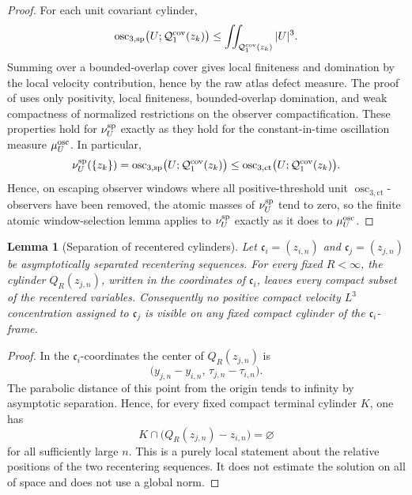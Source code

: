 \documentclass[11pt]{amsart}
\numberwithin{equation}{section}
\theoremstyle{plain}
\newtheorem{lemma}[lemma]{Lemma}
\theoremstyle{definition}
\theoremstyle{remark}
\newcommand{\oscsp}{\operatorname{osc}_{3,\mathrm{sp}}}
\newcommand{\actthree}{\operatorname{osc}_{3,\mathrm{ct}}}
\begin{document}
\begin{proof}
For each unit covariant cylinder,
\[
   \oscsp\bigl(U;\mathcal Q_1^{\rm cov}(z_k)\bigr)
   \le
   \iint_{\mathcal Q_1^{\rm cov}(z_k)}|U|^3 .
\]
Summing over a bounded-overlap cover gives local finiteness and domination by
the local velocity contribution, hence by the raw atlas defect measure.  The proof of
 uses only positivity, local finiteness,
bounded-overlap domination, and weak compactness of normalized restrictions on
the observer compactification.  These properties hold for
\(\nu_U^{\rm sp}\) exactly as they hold for the constant-in-time oscillation
measure \(\mu_U^{\rm osc}\).  In particular,
\[
   \nu_U^{\rm sp}(\{z_k\})
   =
   \oscsp\bigl(U;\mathcal Q_1^{\rm cov}(z_k)\bigr)
   \le
   \actthree\bigl(U;\mathcal Q_1^{\rm cov}(z_k)\bigr).
\]
Hence, on escaping observer windows where all positive-threshold unit
\(\actthree\)-observers have been removed, the atomic masses of
\(\nu_U^{\rm sp}\) tend to zero, so the finite atomic window-selection lemma
applies to \(\nu_U^{\rm sp}\) exactly as it does to \(\mu_U^{\rm osc}\).
\end{proof}

\begin{lemma}[Separation of recentered cylinders]
\label{lem:separated-recentered-cylinders}
Let \(\mathfrak c_i=(z_{i,n})\) and \(\mathfrak c_j=(z_{j,n})\) be
asymptotically separated recentering sequences.  For every fixed \(R<\infty\), the
cylinder \(Q_R(z_{j,n})\), written in the coordinates of \(\mathfrak c_i\),
leaves every compact subset of the recentered variables.  Consequently
no positive compact velocity \(L^3\) concentration assigned to \(\mathfrak c_j\) is visible on any
fixed compact cylinder of the \(\mathfrak c_i\)-frame.
\end{lemma}

\begin{proof}
In the \(\mathfrak c_i\)-coordinates the center of \(Q_R(z_{j,n})\) is
\[
   \bigl(y_{j,n}-y_{i,n},\,\tau_{j,n}-\tau_{i,n}\bigr).
\]
The parabolic distance of this point from the origin tends to infinity by
asymptotic separation.  Hence, for every fixed compact terminal cylinder
\(K\), one has
\[
   K\cap\bigl(Q_R(z_{j,n})-z_{i,n}\bigr)=\varnothing
\]
for all sufficiently large \(n\).  This is a purely local statement about the
relative positions of the two recentering sequences.  It does not estimate the solution on
all of space and does not use a global norm.
\end{proof}
\end{document}
